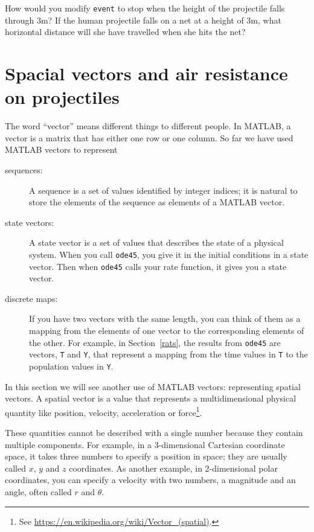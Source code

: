 \documentclass{book}
\begin{document}
\begin{ex}
How would you modify {\tt event} to stop when the height of
the projectile falls through 3m?  
If the human projectile falls on a net at a height of 3m, what
horizontal distance will she have travelled when she hits the
net?
\end{ex}


\section{Spacial vectors and air resistance on projectiles}
\label{spacial}

The word ``vector'' means different things to different people.
In MATLAB, a vector is a matrix that has either one row or one
column.  So far we have used MATLAB vectors to represent

\begin{description}

\item[sequences:] A sequence is a set of values identified by
integer indices; it is natural to store the elements of the
sequence as elements of a MATLAB vector.

\item[state vectors:] A state vector is a set of values that
describes the state of a physical system.  When you call
{\tt ode45}, you give it in the initial conditions in a state
vector.  Then when {\tt ode45} calls your rate function, it
gives you a state vector.

\item[discrete maps:] If you have two vectors with the same
length, you can think of them as a mapping from the elements
of one vector to the corresponding elements of the other.  For
example, in Section~\ref{rats}, the results from {\tt ode45}
are vectors, {\tt T} and {\tt Y}, that represent a mapping
from the time values in {\tt T} to the population values in {\tt Y}.

\end{description}

In this section we will see another use of MATLAB vectors:
representing spatial vectors.  A spatial vector is a value that
represents a multidimensional physical quantity like position,
velocity, acceleration or force\footnote{See
\url{https://en.wikipedia.org/wiki/Vector_(spatial)}.}.

These quantities cannot be described with a
single number because they contain multiple components.  For example,
in a 3-dimensional Cartesian coordinate space, it takes three numbers
to specify a position in space; they are usually called $x$, $y$ and
$z$ coordinates.  As another example, in 2-dimensional polar
coordinates, you can specify a velocity with two numbers, a
magnitude and an angle, often called $r$ and $\theta$.
\end{document}

